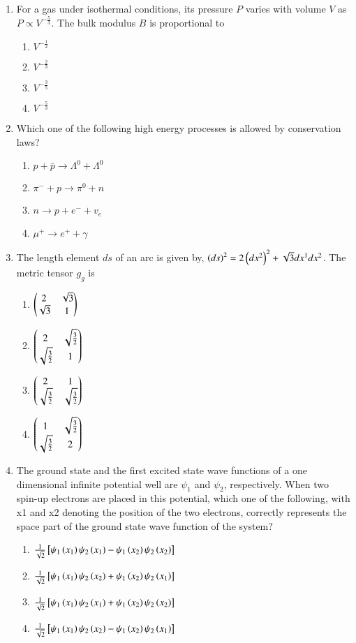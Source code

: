 \documentclass[journal,12pt,onecolumn]{IEEEtran}
\theoremstyle{remark}
\begin{document}
\begin{enumerate}
\item For a gas under isothermal conditions, its pressure $P$ varies with volume $V$ as $P \propto V^{-\frac{5}{3}}$. The bulk modulus $B$ is proportional to
\begin{enumerate}
\item $V^{-\frac{1}{2}}$
\item $V^{-\frac{2}{3}}$
\item $V^{-\frac{3}{5}}$
\item $V^{-\frac{5}{3}}$
\end{enumerate}

\item Which one of the following high energy processes is allowed by conservation laws?
\begin{enumerate}
\item $p + \bar{p} \to \Lambda^0 + \Lambda^0$
\item $\pi^- + p \to \pi^0 + n$
\item $n \to p + e^- + v_e$
\item $\mu^+ \to e^+ + \gamma$
\end{enumerate}

\item The length element $ds$ of an arc is given by, $\left(ds\right)^2 = 2\left(dx^2\right)^2 + \sqrt{3}dx^1dx^2$. The metric tensor $g_g$ is
\begin{enumerate}
\item $\begin{pmatrix}2 & \sqrt{3}\\\sqrt{3} & 1\end{pmatrix}$
\item $\begin{pmatrix}2 & \sqrt{\frac{3}{2}}\\\sqrt{\frac{3}{2}} & 1\end{pmatrix}$
\item $\begin{pmatrix}2 & 1\\\sqrt{\frac{3}{2}} & \sqrt{\frac{3}{2}}\end{pmatrix}$
\item $\begin{pmatrix}1 & \sqrt{\frac{3}{2}}\\\sqrt{\frac{3}{2}} & 2\end{pmatrix}$
\end{enumerate}

\item The ground state and the first excited state wave functions of a one dimensional infinite potential well are $\psi_1$ and $\psi_2$, respectively. When two spin-up electrons are placed in this potential, which one of the following, with x1 and x2 denoting the position of the two electrons, correctly represents the space part of the ground state wave function of the system?
\begin{enumerate}
\item $\frac{1}{\sqrt{2}}{}\left[\psi_1\left(x_1\right)\psi_2\left(x_1\right) - \psi_1\left(x_2\right)\psi_2\left(x_2\right)\right]$
\item $\frac{1}{\sqrt{2}}{}\left[\psi_1\left(x_1\right)\psi_2\left(x_2\right) + \psi_1\left(x_2\right)\psi_2\left(x_1\right)\right]$
\item $\frac{1}{\sqrt{2}}{}\left[\psi_1\left(x_1\right)\psi_2\left(x_1\right) + \psi_1\left(x_2\right)\psi_2\left(x_2\right)\right]$
\item $\frac{1}{\sqrt{2}}{}\left[\psi_1\left(x_1\right)\psi_2\left(x_2\right) - \psi_1\left(x_2\right)\psi_2\left(x_1\right)\right]$
\end{enumerate}


\end{enumerate}
\end{document}
